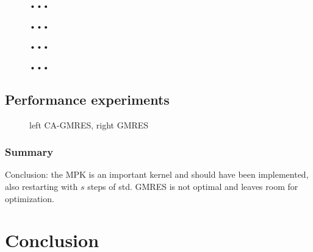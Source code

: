\documentclass{scrartcl}
\numberwithin{equation}{section}
\begin{document}
\begin{figure}
	\centering
	\resizebox{.9\textwidth}{!}{}
	\caption{•••}
	\label{fig:xenon2}
\end{figure}
\begin{figure}
	\centering
	\resizebox{.9\textwidth}{!}{}
	\caption{•••}
	\label{fig:xenon2_scale}
\end{figure}
\begin{figure}
	\centering
	\resizebox{.9\textwidth}{!}{}
	\caption{•••}
	\label{fig:bcsstk18_noscale}
\end{figure}
\begin{figure}
	\centering
	\resizebox{.9\textwidth}{!}{}
	\caption{•••}
	\label{fig:bcsstk18_scale}
\end{figure}

\subsection{Performance experiments}
\begin{figure}[H]
	\centering
	\resizebox{1.0\textwidth}{!}{}
	\caption{left CA-GMRES, right GMRES}
\end{figure}

\subsubsection{Summary}
Conclusion: the MPK is an important kernel and should have been implemented, also restarting with $s$ steps of std. GMRES is not optimal and leaves room for optimization.

\section{Conclusion}
\end{document}
